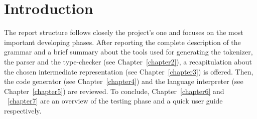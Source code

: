 \chapter{Introduction}

The report structure follows closely the project's one and focuses on the most important developing phases. After reporting the complete description of the \fwap grammar and a brief summary about the tools used for generating the tokenizer, the parser and the type-checker (see Chapter~\ref{chapter2}), a recapitulation about the chosen intermediate representation (see Chapter~\ref{chapter3}) is offered. Then, the \fsharp code generator (see Chapter~\ref{chapter4}) and the language interpreter (see Chapter~\ref{chapter5}) are reviewed. To conclude, Chapter~\ref{chapter6} and ~\ref{chapter7} are an overview of the testing phase and a quick user guide respectively.